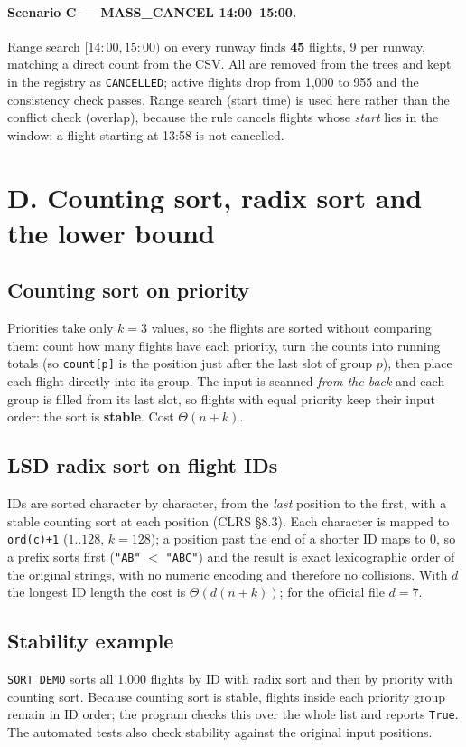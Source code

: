 \documentclass[11pt]{article}
\begin{document}
\paragraph{Scenario C --- MASS\_CANCEL 14:00--15:00.}
Range search $[14{:}00, 15{:}00)$ on every runway finds \textbf{45} flights,
9 per runway, matching a direct count from the CSV. All are removed from the
trees and kept in the registry as \texttt{CANCELLED}; active flights drop from
1{,}000 to 955 and the consistency check passes. Range search (start time)
is used here rather than the conflict check (overlap), because the rule
cancels flights whose \emph{start} lies in the window: a flight starting at
13:58 is not cancelled.


\section{D. Counting sort, radix sort and the lower bound}

\subsection{Counting sort on priority}
Priorities take only $k = 3$ values, so the flights are sorted without
comparing them: count how many flights have each priority, turn the counts
into running totals (so \texttt{count[p]} is the position just after the last
slot of group $p$), then place each flight directly into its group. The input
is scanned \emph{from the back} and each group is filled from its last slot,
so flights with equal priority keep their input order: the sort is
\textbf{stable}. Cost $\Theta(n + k)$.

\subsection{LSD radix sort on flight IDs}
IDs are sorted character by character, from the \emph{last} position to the
first, with a stable counting sort at each position (CLRS \S8.3). Each
character is mapped to \texttt{ord(c)+1} ($1..128$, $k = 128$); a position past
the end of a shorter ID maps to $0$, so a prefix sorts first (\texttt{"AB"}
$<$ \texttt{"ABC"}) and the result is exact lexicographic order of the
original strings, with no numeric encoding and therefore no collisions. With
$d$ the longest ID length the cost is $\Theta(d(n + k))$; for the official
file $d = 7$.

\subsection{Stability example}
\texttt{SORT\_DEMO} sorts all 1{,}000 flights by ID with radix sort and then by
priority with counting sort. Because counting sort is stable, flights inside
each priority group remain in ID order; the program checks this over the whole
list and reports \texttt{True}. The automated tests also check stability
against the original input positions.
\end{document}
